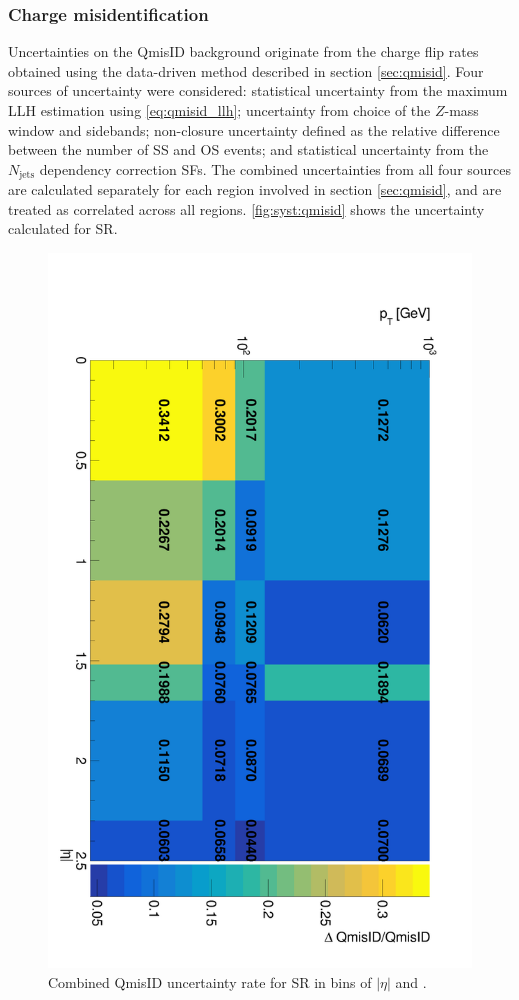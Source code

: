 \documentclass[../thesis.tex]{subfiles}
\begin{document}
\subsubsection*{Charge misidentification}
Uncertainties on the \acs{QmisID} background originate from the charge flip rates obtained using the data-driven method described in section \ref{sec:qmisid}. Four sources of uncertainty were considered: statistical uncertainty from the maximum \acs{LLH} estimation using \autoref{eq:qmisid_llh}; uncertainty from choice of the $Z$-mass window and sidebands; non-closure uncertainty defined as the relative difference between the number of \acs{SS} and \acs{OS} events; and statistical uncertainty from the $N_\text{jets}$ dependency correction \acs{SF}s. The combined uncertainties from all four sources are calculated separately for each region involved in section \ref{sec:qmisid}, and are treated as correlated across all regions. \autoref{fig:syst:qmisid} shows the uncertainty calculated for \acs{SR}.

\begin{figure}[!htb]
\begin{center}
\includegraphics[width=0.9\linewidth]{fig/syst_qmisid_combined.png}
\caption{\label{fig:syst:qmisid}Combined \acs{QmisID} uncertainty rate for \acs{SR} in bins of $|\eta|$ and \pT.}
\end{center}
\end{figure}
\end{document}
